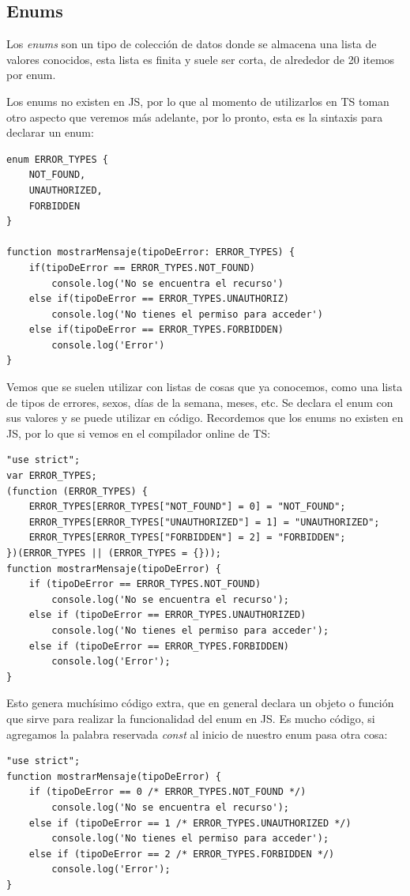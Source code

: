 \subsection{Enums}

Los \textit{enums} son un tipo de colección de datos donde se almacena una lista de valores conocidos, esta lista es finita y suele ser corta, de alrededor de 20 itemos por enum.

Los enums no existen en JS, por lo que al momento de utilizarlos en TS toman otro aspecto que veremos más adelante, por lo pronto, esta es la sintaxis para declarar un enum:
\begin{lstlisting}
enum ERROR_TYPES {
    NOT_FOUND,
    UNAUTHORIZED,
    FORBIDDEN
}

function mostrarMensaje(tipoDeError: ERROR_TYPES) {
    if(tipoDeError == ERROR_TYPES.NOT_FOUND)
        console.log('No se encuentra el recurso')
    else if(tipoDeError == ERROR_TYPES.UNAUTHORIZ)
        console.log('No tienes el permiso para acceder')
    else if(tipoDeError == ERROR_TYPES.FORBIDDEN)
        console.log('Error')
}
\end{lstlisting}

Vemos que se suelen utilizar con listas de cosas que ya conocemos, como una lista de tipos de errores, sexos, días de la semana, meses, etc. Se declara el enum con sus valores y se puede utilizar en código. Recordemos que los enums no existen en JS, por lo que si vemos en el compilador online de TS:
\begin{lstlisting}
"use strict";
var ERROR_TYPES;
(function (ERROR_TYPES) {
    ERROR_TYPES[ERROR_TYPES["NOT_FOUND"] = 0] = "NOT_FOUND";
    ERROR_TYPES[ERROR_TYPES["UNAUTHORIZED"] = 1] = "UNAUTHORIZED";
    ERROR_TYPES[ERROR_TYPES["FORBIDDEN"] = 2] = "FORBIDDEN";
})(ERROR_TYPES || (ERROR_TYPES = {}));
function mostrarMensaje(tipoDeError) {
    if (tipoDeError == ERROR_TYPES.NOT_FOUND)
        console.log('No se encuentra el recurso');
    else if (tipoDeError == ERROR_TYPES.UNAUTHORIZED)
        console.log('No tienes el permiso para acceder');
    else if (tipoDeError == ERROR_TYPES.FORBIDDEN)
        console.log('Error');
}
\end{lstlisting}

Esto genera muchísimo código extra, que en general declara un objeto o función que sirve para realizar la funcionalidad del enum en JS. Es mucho código, si agregamos la palabra reservada \textit{const} al inicio de nuestro enum pasa otra cosa:
\begin{lstlisting}
"use strict";
function mostrarMensaje(tipoDeError) {
    if (tipoDeError == 0 /* ERROR_TYPES.NOT_FOUND */)
        console.log('No se encuentra el recurso');
    else if (tipoDeError == 1 /* ERROR_TYPES.UNAUTHORIZED */)
        console.log('No tienes el permiso para acceder');
    else if (tipoDeError == 2 /* ERROR_TYPES.FORBIDDEN */)
        console.log('Error');
}
\end{lstlisting}

